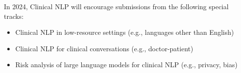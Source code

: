 \begin{wsschedulenolist}
In 2024, Clinical NLP will encourage submissions from the following special tracks:
\begin{itemize}
\item Clinical NLP in low-resource settings (e.g., languages other than English)
\item Clinical NLP for clinical conversations (e.g., doctor-patient)
\item Risk analysis of large language models for clinical NLP (e.g., privacy, bias)
\end{itemize}


\end{wsschedulenolist}
